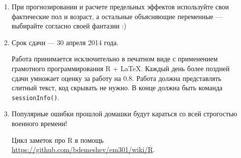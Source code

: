 \documentclass[a4paper]{article}
\begin{document}
\begin{enumerate}
\item При прогнозировании и расчете предельных эффектов используйте свои фактические пол и возраст, а остальные объясняющие переменные --- выбирайте согласно своей фантазии :)

\item Срок сдачи --- 30 апреля 2014 года. 

Работа принимается исключительно в печатном виде с применением грамотного программирования R + \LaTeX. Каждый день более поздней сдачи умножает оценку за работу на $0.8$.  Работа должна представлять слитный текст, код скрывать не нужно. В конце должна быть команда \verb|sessionInfo()|.

\item Популярные ошибки прошлой домашки будут караться со всей строгостью военного времени! 

Цикл заметок про R в помощь \url{https://github.com/bdemeshev/em301/wiki/R}.
 
\end{enumerate}
\end{document}
